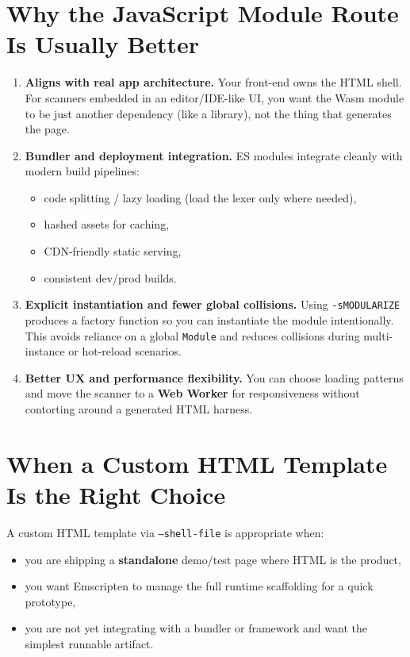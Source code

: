 \documentclass[11pt]{article}
\begin{document}
\section*{Why the JavaScript Module Route Is Usually Better}
\begin{enumerate}[leftmargin=*, itemsep=0.3em]
  \item \textbf{Aligns with real app architecture.} Your front-end owns the HTML shell. For scanners embedded in an editor/IDE-like UI, you want the Wasm module to be just another dependency (like a library), not the thing that generates the page.
  \item \textbf{Bundler and deployment integration.} ES modules integrate cleanly with modern build pipelines:
    \begin{itemize}[leftmargin=*, itemsep=0.2em]
      \item code splitting / lazy loading (load the lexer only where needed),
      \item hashed assets for caching,
      \item CDN-friendly static serving,
      \item consistent dev/prod builds.
    \end{itemize}
  \item \textbf{Explicit instantiation and fewer global collisions.} Using \texttt{-sMODULARIZE} produces a factory function so you can instantiate the module intentionally. This avoids reliance on a global \texttt{Module} and reduces collisions during multi-instance or hot-reload scenarios.
  \item \textbf{Better UX and performance flexibility.} You can choose loading patterns and move the scanner to a \textbf{Web Worker} for responsiveness without contorting around a generated HTML harness.
\end{enumerate}

\section*{When a Custom HTML Template Is the Right Choice}
A custom HTML template via \texttt{--shell\allowbreak-file} is appropriate when:
\begin{itemize}[leftmargin=*, itemsep=0.3em]
  \item you are shipping a \textbf{standalone} demo/test page where HTML is the product,
  \item you want Emscripten to manage the full runtime scaffolding for a quick prototype,
  \item you are not yet integrating with a bundler or framework and want the simplest runnable artifact.
\end{itemize}
\end{document}
